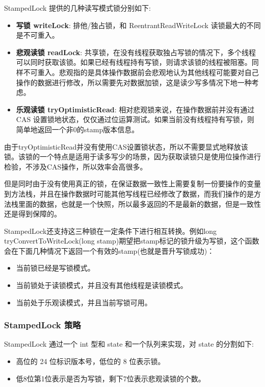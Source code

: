 StampedLock 提供的几种读写模式锁分别如下:
\begin{itemize}
    \item \textbf{写锁 writeLock}: 排他/独占锁，和 ReentrantReadWriteLock 读锁最大的不同是不可重入。
    \item \textbf{悲观读锁 readLock}: 共享锁，在没有线程获取独占写锁的情况下，多个线程可以同时获取该锁。如果已经有线程持有写锁，则请求该锁的线程被阻塞。同样不可重入。悲观指的是具体操作数据前会悲观地认为其他线程可能要对自己操作的数据进行修改，所以需要先对数据加锁，这是读少写多情况下地一种考虑。
    \item \textbf{乐观读锁 tryOptimisticRead}: 相对悲观锁来说，在操作数据前并没有通过 CAS 设置锁地状态，仅仅通过位运算测试。如果当前没有线程持有写锁，则简单地返回一个非0的stamp版本信息。
\end{itemize}

由于tryOptimisticRead并没有使用CAS设置锁状态，所以不需要显式地释放该锁。该锁的一个特点是适用于读多写少的场景，因为获取读锁只是使用位操作进行检验，不涉及CAS操作，所以效率会高很多。

但是同时由于没有使用真正的锁，在保证数据一致性上需要复制一份要操作的变量到方法栈，并且在操作数据时可能其他写线程已经修改了数据，而我们操作的是方法栈里面的数据，也就是一个快照，所以最多返回的不是最新的数据，但是一致性还是得到保障的。

StampedLock还支持这三种锁在一定条件下进行相互转换。例如long tryConvertToWriteLock(long  stamp)期望把stamp标记的锁升级为写锁，这个函数会在下面几种情况下返回一个有效的stamp(也就是晋升写锁成功)：

\begin{itemize}
    \item 当前锁已经是写锁模式。
    \item 当前锁处于读锁模式，并且没有其他线程是读锁模式。
    \item 当前处于乐观读模式，并且当前写锁可用。
\end{itemize}

\subsubsection*{StampedLock 策略}

StampedLock 通过一个 int 型和 state 和一个队列来实现，对 state 的分割如下:
\begin{itemize}
    \item 高位的 24 位标识版本号，低位的 8 位表示锁。
    \item 低8位第1位表示是否为写锁，剩下7位表示悲观读锁的个数。
\end{itemize}

